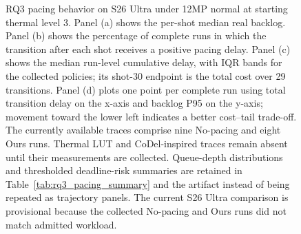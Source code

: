 \begin{figure}[t]
\begin{lrbox}{\rqthreefigurebox}
  \end{lrbox}
  \resizebox{\textwidth}{!}{\usebox{\rqthreefigurebox}}

  \caption{RQ3 pacing behavior on S26 Ultra under 12MP normal at
  starting thermal level 3.  Panel (a) shows the per-shot median real backlog.
  Panel (b) shows the percentage of complete runs in which the transition
  after each shot receives a positive pacing delay.  Panel (c) shows the
  median run-level cumulative delay, with IQR bands for the collected policies;
  its shot-30 endpoint is the total cost over 29 transitions.  Panel (d) plots
  one point per complete run using total transition delay on the x-axis and
  backlog P95 on the y-axis; movement toward the lower left indicates a better
  cost--tail trade-off.  The currently available traces comprise nine
  No-pacing and eight Ours runs.  Thermal LUT and CoDel-inspired traces remain
  absent until their measurements are collected.  Queue-depth distributions
  and thresholded deadline-risk summaries are retained in
  Table~\ref{tab:rq3_pacing_summary} and the artifact instead of being repeated
  as trajectory panels.  The current S26 Ultra comparison is provisional
  because the collected No-pacing and Ours runs did not match admitted
  workload.}
  \label{fig:rq3_pacing_trajectories}
\end{figure}
